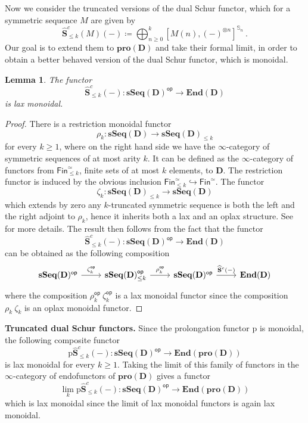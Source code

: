 \documentclass{proc-l}
\theoremstyle{plain}
\newtheorem{lemma}[{theorem}]{Lemma}
\theoremstyle{definition}
\theoremstyle{remark}
\begin{document}
Now we consider the truncated versions of the dual Schur functor, which for a symmetric sequence $M$ are given by
\[
\widehat{\mathbf{S}}^c_{\leq k}(M)(-) \coloneqq \displaystyle \bigoplus_{n \geq 0}^{k} \left[M(n),(-)^{\otimes n} \right]^{\mathbb{S}_n}~.
\]
Our goal is to extend them to $\mathbf{pro}(\mathbf{D})$ and take their formal limit, in order to obtain a better behaved version of the dual Schur functor, which is monoidal.

\begin{lemma}%
\label{Lemma:3.5}The functor
\[
\widehat{\mathbf{S}}^c_{\leq k}(-): \mathbf{sSeq}(\mathbf{D})^{\mathsf{op}} \longrightarrow \mathbf{End}(\mathbf{D})
\]
is lax monoidal.
\end{lemma}

\begin{proof}
There is a restriction monoidal functor
\[
\rho_k: \mathbf{sSeq}(\mathbf{D}) \longrightarrow \mathbf{sSeq}(\mathbf{D})_{\leq k}
\]
for every $k \geq 1$, where on the right hand side we have the $\infty$-category of symmetric sequences of at most arity $k$. It can be defined as the $\infty$-category of functors from $\mathsf{Fin}^{\simeq}_{\leq k}$, finite sets of at most $k$ elements, to $\mathbf{D}$. The restriction functor is induced by the obvious inclusion $\mathsf{Fin}^{\simeq}_{\leq k} \hookrightarrow \mathsf{Fin}^{\simeq}$. The functor
\[
\zeta_k: \mathbf{sSeq}(\mathbf{D})_{\leq k} \longrightarrow \mathbf{sSeq}(\mathbf{D})
\]
which extends by zero any $k$-truncated symmetric sequence is both the left and the right adjoint to $\rho_k$, hence it inherits both a lax and an oplax structure. See \cite[Section 4]{heuts2024} for more details. The result then follows from the fact that the functor
\[
\widehat{\mathbf{S}}^c_{\leq k}(-): \mathbf{sSeq}(\mathbf{D})^{\mathsf{op}} \longrightarrow \mathbf{End}(\mathbf{D})
\]
can be obtained as the following composition
\[
\begin{tikzcd}
\mathbf{sSeq}(\mathbf{D})^{\mathsf{op}} \arrow[r,"\zeta_k^\mathsf{op}"]
&\mathbf{sSeq}(\mathbf{D})_{\leq k}^{\mathsf{op}} \arrow[r,"\rho_k^\mathsf{op}"]
&\mathbf{sSeq}(\mathbf{D})^{\mathsf{op}} \arrow[r,"\widehat{\mathbf{S}}^c(-)"]
&\mathbf{End}(\mathbf{D})
\end{tikzcd}
\]
where the composition $\rho_k^\mathsf{op}~\zeta_k^\mathsf{op}$ is a lax monoidal functor since the composition $ \rho_k ~ \zeta_k$ is an oplax monoidal functor.
\end{proof}

\textbf{Truncated dual Schur functors.} Since the prolongation functor $\mathrm{p}$ is monoidal, the following composite functor
\[
\mathrm{p}\widehat{\mathbf{S}}^c_{\leq k}(-): \mathbf{sSeq}(\mathbf{D})^{\mathsf{op}} \longrightarrow \mathbf{End}(\mathbf{pro}(\mathbf{D}))
\]
is lax monoidal for every $k \geq 1$. Taking the limit of this family of functors in the $\infty$-category of endofunctors of $\mathbf{pro}(\mathbf{D})$ gives a functor
\[
\lim_k \mathrm{p}\widehat{\mathbf{S}}^c_{\leq k}(-): \mathbf{sSeq}(\mathbf{D})^{\mathsf{op}} \longrightarrow \mathbf{End}(\mathbf{pro}(\mathbf{D}))
\]
which is lax monoidal since the limit of lax monoidal functors is again lax monoidal.
\end{document}

